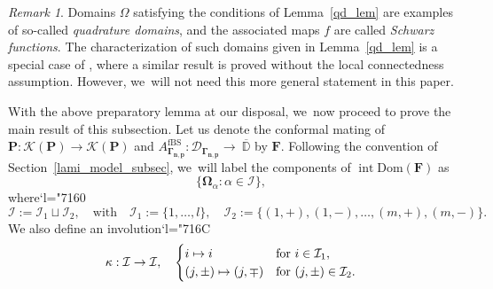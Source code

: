 \documentclass[JEP,XML,SOM,Unicode,NoFloatCountersInSection,published]{cedram}
\newcommand{\Changel}{\mathcode`l="7160}
\newcommand{\Changelback}{\mathcode`l="716C}
\def\mto{\mathchoice{\longmapsto}{\mapsto}{\mapsto}{\mapsto}}
\theoremstyle{definition}
\theoremstyle{remark}
\newtheorem{remark}[lemma]{Remark}
\newcommand{\D}{\mathbb{D}}
\DeclareMathOperator{\Int}{int}
\begin{document}
\begin{remark}
Domains $\Omega$ satisfying the conditions of Lemma~\ref{qd_lem} are examples of so-called \emph{quadrature domains}, and the associated maps $f$ are called \emph{Schwarz functions}. The characterization of such domains given in Lemma~\ref{qd_lem} is a special case of \cite[Th.\,1]{AS76}, where a similar result is proved without the local connectedness assumption. However, we~will not need this more general statement in this paper.
\end{remark}

With the above preparatory lemma at our disposal, we~now proceed to prove the main result of this subsection.
Let us denote the conformal mating of $\pmb{P}:\mathcal{K}(\pmb{P})\to\mathcal{K}(\pmb{P})$ and $A_{\pmb{\Gamma_{n,p}}}^{\mathrm{fBS}}:\mathcal{D}_{\pmb{\Gamma_{n,p}}}\to~\overline{\D}$ by $\pmb{F}$. Following the convention of Section~\ref{lami_model_subsec}, we~will label the components of $\Int{\mathrm{Dom}(\pmb{F})}$ as\vspace*{-3pt}
\[
\{\pmb{\Omega}_\alpha:\alpha\in\mathcal{I}\},
\]
where\vspace*{-3pt}\Changel
\[
\mathcal{I}:=\mathcal{I}_1\sqcup\mathcal{I}_2,\quad \text{with}\quad \mathcal{I}_1:=\{1,\dots, l\},\quad \mathcal{I}_2:=\{(1,+),(1,-),\dots,(m,+),(m,-)\}.
\]
We also define an involution\vspace*{-3pt}\Changelback
\[
\kappa:\mathcal{I}\to\mathcal{I},\quad
\begin{cases}
i\mto i& \text{for}\ i\in\mathcal{I}_1,\\
(j,\pm)\mto (j,\mp)& \text{for}\ (j,\pm)\in\mathcal{I}_2.
\end{cases}
\]
\end{document}
